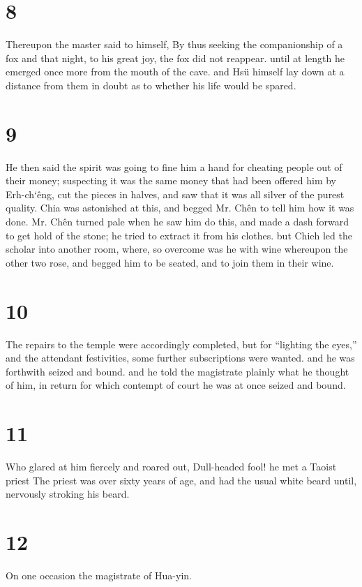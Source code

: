 \documentclass[11pt,a5paper]{book}
\begin{document}
\chapter*{\normalfont\Large 8}
Thereupon the master said to himself, By thus seeking the companionship of a fox and that night, to his great joy, the fox did not reappear. until at length he emerged once more from the mouth of the cave. and Hsü himself lay down at a distance from them in doubt as to whether his life would be spared.
\clearpage

\chapter*{\normalfont\Large 9}
He then said the spirit was going to fine him a hand for cheating people out of their money; suspecting it was the same money that had been offered him by Erh-ch‘êng, cut the pieces in halves, and saw that it was all silver of the purest quality. Chia was astonished at this, and begged Mr. Chên to tell him how it was done. Mr. Chên turned pale when he saw him do this, and made a dash forward to get hold of the stone; he tried to extract it from his clothes. but Chieh led the scholar into another room, where, so overcome was he with wine whereupon the other two rose, and begged him to be seated, and to join them in their wine.
\clearpage

\chapter*{\normalfont\Large 10}
The repairs to the temple were accordingly completed, but for “lighting the eyes,” and the attendant festivities, some further subscriptions were wanted. and he was forthwith seized and bound. and he told the magistrate plainly what he thought of him, in return for which contempt of court he was at once seized and bound.
\clearpage

\chapter*{\normalfont\Large 11}
Who glared at him fiercely and roared out, Dull-headed fool! he met a Taoist priest The priest was over sixty years of age, and had the usual white beard until, nervously stroking his beard.
\clearpage

\chapter*{\normalfont\Large 12}
On one occasion the magistrate of Hua-yin.
\clearpage
\end{document}
